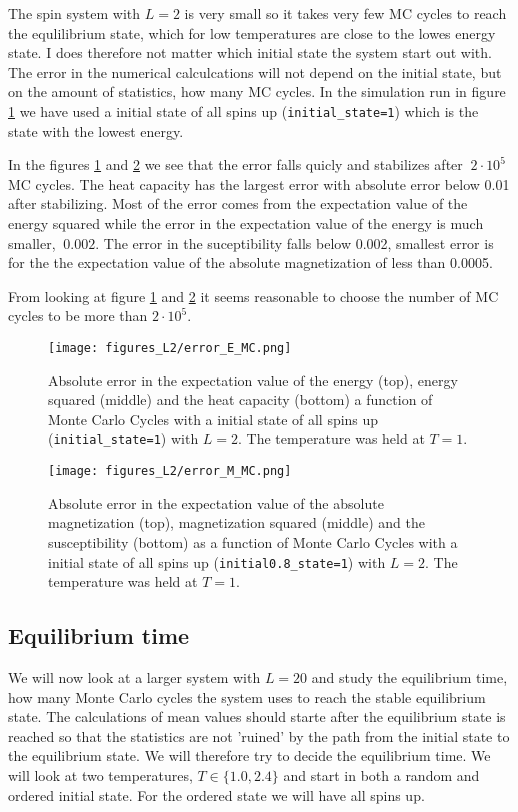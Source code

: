 \documentclass[11pt,a4wide]{article}
\begin{document}
The spin system with $L=2$ is very small so it takes very few MC cycles to reach the equlilibrium state, which for low temperatures are close to the lowes energy state. I does therefore not matter which initial state the system start out with. The error in the numerical calculcations will not depend on the initial state, but on the amount of statistics, how many MC cycles. In the simulation run in figure \ref{fig: error E} we have used a initial state of all spins up (\texttt{initial\_state=1}) which is the state with the lowest energy.  

In the figures \ref{fig: error E} and \ref{fig: error M} we see that the error falls quicly and stabilizes after $~2\cdot 10^5$ MC cycles. The heat capacity has the largest error with absolute error below 0.01 after stabilizing. Most of the error comes from the expectation value of the energy squared while the error in the expectation value of the energy is much smaller, $~0.002$. The error in the suceptibility falls below 0.002, smallest error is for the the expectation value of the absolute magnetization of less than 0.0005.

From looking at figure \ref{fig: error E} and \ref{fig: error M} it seems reasonable to choose the number of MC cycles to be more than $2\cdot10^5$.

\begin{figure}[htp]
\centering
\texttt{[image: figures\_L2/error\_E\_MC.png]}
\caption{Absolute error in the expectation value of the energy (top), energy squared (middle) and the heat capacity (bottom) a function of Monte Carlo Cycles with a initial state of all spins up (\texttt{initial\_state=1}) with $L=2$. The temperature was held at $T=1$. }
\label{fig: error E}
\end{figure}

\begin{figure}[htp]
\centering
\texttt{[image: figures\_L2/error\_M\_MC.png]}
\caption{Absolute error in the expectation value of the absolute magnetization (top), magnetization squared (middle) and the susceptibility (bottom) as a function of Monte Carlo Cycles with a initial state of all spins up (\texttt{initial0.8\_state=1}) with $L=2$. The temperature was held at $T=1$. }
\label{fig: error M}
\end{figure}

\subsection{Equilibrium time}
We will now look at a larger system with $L=20$ and study the equilibrium time, how many Monte Carlo cycles the system uses to reach the stable equilibrium state. The calculations of mean values should starte after the equilibrium state is reached so that the statistics are not 'ruined' by the path from the initial state to the equilibrium state. We will therefore try to decide the equilibrium time. We will look at two temperatures, $T\in \{1.0, 2.4\}$ and start in both a random and ordered initial state. For the ordered state we will have all spins up. 
\end{document}
